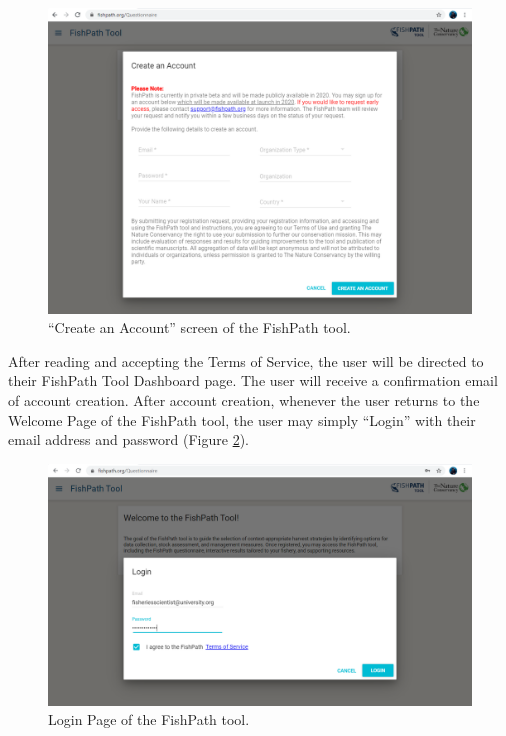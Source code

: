 \documentclass[11pt,]{book}
\begin{document}
\begin{figure}

{\centering \includegraphics[width=0.95\linewidth]{images/create-account} 

}

\caption{“Create an Account” screen of the FishPath tool.}\label{fig:create-account}
\end{figure}

After reading and accepting the Terms of Service, the user will be directed to their FishPath Tool Dashboard page. The user will receive a confirmation email of account creation. After account creation, whenever the user returns to the Welcome Page of the FishPath tool, the user may simply ``Login'' with their email address and password (Figure \ref{fig:login-page}).

\begin{figure}

{\centering \includegraphics[width=0.95\linewidth]{images/login-page} 

}

\caption{Login Page of the FishPath tool.}\label{fig:login-page}
\end{figure}
\end{document}
